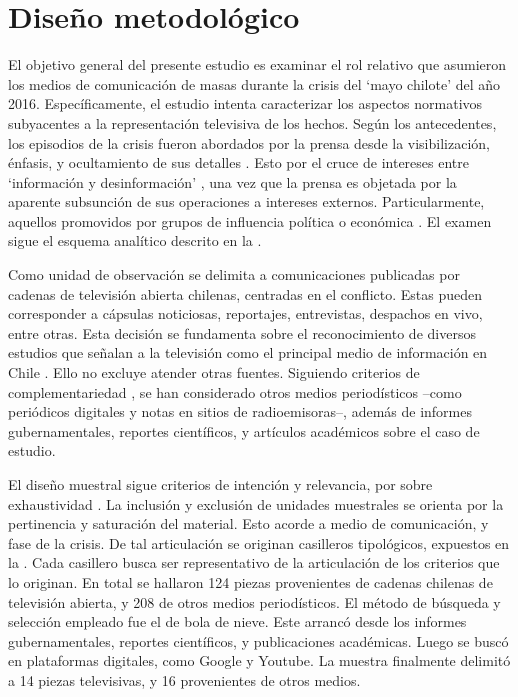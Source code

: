 \documentclass{textolivre}
\begin{document}
\section{Diseño metodológico}\label{sec-deseno}
El objetivo general del presente estudio es examinar el rol relativo que asumieron
los medios de comunicación de masas durante la crisis del ‘mayo chilote’ del año 2016.
Específicamente, el estudio intenta caracterizar los aspectos normativos subyacentes a la
representación televisiva de los hechos. Según los antecedentes, los episodios de la crisis
fueron abordados por la prensa desde la visibilización, énfasis, y ocultamiento de sus
detalles \cite{cabello2018,ValdebenitoAllendes2018}. Esto por el cruce
de intereses entre ‘información y desinformación’ \cite{cardenas2019,Santander2014,sapiezynska2013}, 
una vez que la prensa es objetada por
la aparente subsunción de sus operaciones a intereses externos. Particularmente,
aquellos promovidos por grupos de influencia política o económica \cite{Habermas2006,Luhmann2007}. 
El examen sigue el esquema analítico descrito en la .

Como unidad de observación se delimita a comunicaciones publicadas por cadenas
de televisión abierta chilenas, centradas en el conflicto. Estas pueden corresponder a
cápsulas noticiosas, reportajes, entrevistas, despachos en vivo, entre otras. Esta decisión
se fundamenta sobre el reconocimiento de diversos estudios que señalan a la televisión
como el principal medio de información en Chile \cite{newman2019}. Ello no excluye
atender otras fuentes. Siguiendo criterios de complementariedad \cite{strauss2002}, 
se han considerado otros medios periodísticos --como periódicos digitales y notas
en sitios de radioemisoras--, además de informes gubernamentales, reportes científicos,
y artículos académicos sobre el caso de estudio.

El diseño muestral sigue criterios de intención y relevancia, por sobre exhaustividad
\cite{MartnezSalgado2012}. La inclusión y exclusión de unidades muestrales se
orienta por la pertinencia y saturación del material. Esto acorde a medio de comunicación,
y fase de la crisis. De tal articulación se originan casilleros tipológicos, expuestos en la
. Cada casillero busca ser representativo de la articulación de los criterios que lo
originan. En total se hallaron 124 piezas provenientes de cadenas chilenas de televisión
abierta, y 208 de otros medios periodísticos. El método de búsqueda y selección
empleado fue el de bola de nieve. Este arrancó desde los informes gubernamentales,
reportes científicos, y publicaciones académicas. Luego se buscó en plataformas digitales,
como Google y Youtube. La muestra finalmente delimitó a 14 piezas televisivas, y 16
provenientes de otros medios.
\end{document}
